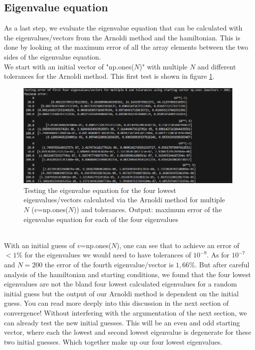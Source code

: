 \documentclass[11pt, letterpaper, onecolumn]{article}
\begin{document}
	\subsection{Eigenvalue equation}
	As a last step, we evaluate the eigenvalue equation that can be calculated with the eigenvalues/vectors from the Arnoldi method and the hamiltonian. This is done by looking at the maximum error of all the array elements between the two sides of the eigenvalue equation.\\
	We start with an initial vector of "np.ones($N$)" with multiple $N$ and different tolerances for the Arnoldi method. This first test is shown in figure \ref{fig:test_eigen_ones}.
	\begin{figure} [H] 
	\begin{center}	
	\includegraphics[width=19cm]{"test_eigen.png"}
	\caption{Testing the eigenvalue equation for the four lowest eigenvalues/vectors calculated via the Arnoldi method for multiple $N$ ($v$=np.ones($N$)) and tolerances. Output: maximum error of the eigenvalue equation for each of the four eigenvalues} \label{fig:test_eigen_ones}
	\end{center}
	\end{figure}
	\\
	With an initial guess of $v$=np.ones($N$), one can see that to achieve an error of $<1\%$ for the eigenvalues we would need to have tolerances of $10^{-9}$. As for $10^{-7}$ and $N=200$ the error of the fourth eigenvalue/vector is $1,66\%$. But after careful analysis of the hamiltonian and starting conditions, we found that the four lowest eigenvalues are not the bland four lowest calculated eigenvalues for a random initial guess but the output of our Arnoldi method is dependent on the initial guess. You can read more deeply into this discussion in the next section of convergence! Without interfering with the argumentation of the next section, we can already test the new initial guesses. This will be an even and odd starting vector, where each the lowest and second lowest eigenvalue is degenerate for these two initial guesses. Which together make up our four lowest eigenvalues.\\
\end{document}
